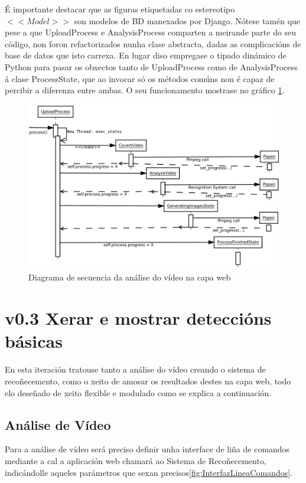         É importante destacar que as figuras etiquetadas co estereotipo $<<Model>>$ son modelos 
        de BD manexados por Django. Nótese tamén que pese a que UploadProcess e AnalysisProcess
        comparten a meirande parte do seu código, non foron refactorizados nunha clase abstracta,
        dadas as complicacións de base de datos que isto carrexa. En lugar diso empregase o 
        tipado dinámico de Python para pasar os obxectos tanto de UploadProcess como de 
        AnalysisProcess á clase ProcessState, que ao invocar só os métodos comúns non é capaz de 
        percibir a diferenza entre ambas. O seu funcionamento mostrase no gráfico
        \ref{fig:AnaliseVideoWeb}.
        
        \begin{figure}[htp]
        \begin{center}
            \includegraphics[scale=0.35]{figures/AnaliseVideoWeb.pdf}
            \caption{Diagrama de secuencia da análise do vídeo na capa web}
        \label{fig:AnaliseVideoWeb}
        \end{center}
        \end{figure}
    
\section{v0.3 Xerar e mostrar deteccións básicas}

    En esta iteración tratouse tanto a análise do vídeo creando o sistema de recoñecemento, como 
    o xeito de amosar os resultados destes na capa web, todo elo deseñado de xeito flexible e 
    modulado como se explica a continuación.
    
    \subsection{Análise de Vídeo}
        Para a análise de vídeo será preciso definir unha interface de liña de comandos mediante
        a cal a aplicación web chamará ao Sistema de Recoñecemento, indicándolle aqueles parámetros
        que sexan precisos\ref{fig:InterfazLineaComandos}.

